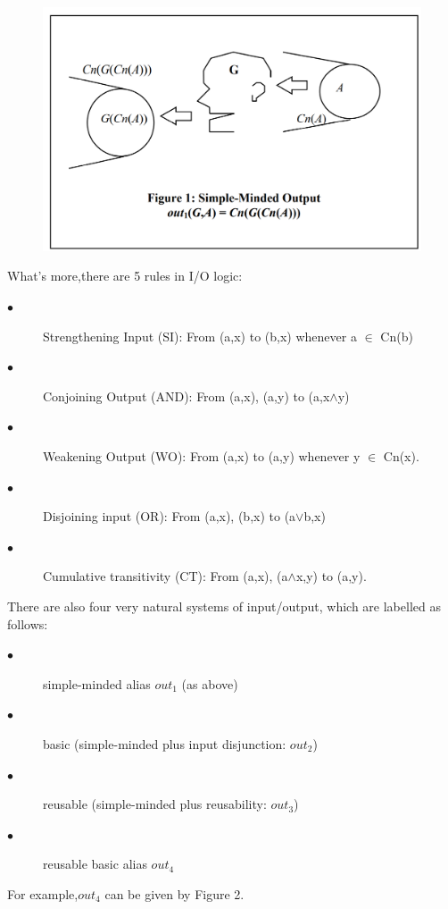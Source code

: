 \documentclass{article}
\begin{document}
\begin{figure}[hb]
\centering
\includegraphics[scale=0.4]{simple_minded.png}

\label{fig_framework}
\end{figure}
What's more,there are 5  rules in I/O logic:
\begin{description}
\item[$\bullet$] Strengthening Input (SI): From (a,x) to (b,x) whenever a $\in$ Cn(b)
\item[$\bullet$] Conjoining Output (AND): From (a,x), (a,y) to (a,x$\wedge$y)
\item[$\bullet$] Weakening Output (WO): From (a,x) to (a,y) whenever y $\in$ Cn(x).
\item[$\bullet$] Disjoining input (OR): From (a,x), (b,x) to (a$\vee$b,x)
\item[$\bullet$] Cumulative transitivity (CT): From (a,x), (a$\wedge$x,y) to (a,y).
\end{description}
There are also four very natural systems of input/output, which are labelled as follows: 
\begin{description}
\item[$\bullet$]simple-minded alias $out_{1}$ (as above)
\item[$\bullet$]basic (simple-minded plus input disjunction: $out_{2}$)
\item[$\bullet$]reusable (simple-minded plus reusability: $out_{3}$)
\item[$\bullet$]reusable basic alias $out_{4}$
\end{description}
For example,$out_{4}$ can be given by Figure 2.\\
\end{document}
